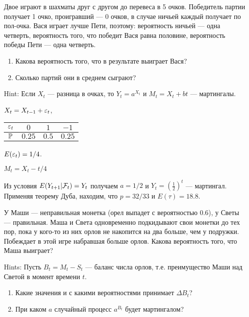 \begin{solution}
\begin{solution}
\begin{solution}
\begin{solution}
\begin{solution}
\begin{solution}
\begin{solution}
\begin{solution}
\begin{solution}
{\begin{problem}
Двое играют в шахматы друг с другом до перевеса в 5 очков. Победитель партии получает 1 очко, проигравший --- 0 очков, в случае ничьей каждый получает по пол-очка. Вася играет лучше Пети, поэтому: вероятность ничьей --- одна четверть, вероятность того, что победит Вася равна половине, вероятность победы Пети --- одна четверть. 
\begin{enumerate}
\item Какова вероятность того, что в результате выиграет Вася? 
\item Сколько партий они в среднем сыграют? 
\end{enumerate}

\end{problem} 
\begin{solution} 

Hint:  Если $X_{t}$ --- разница в очках, то $Y_t=a^{X_{t}}$ и $M_t=X_{t}+bt$ --- мартингалы. 

$X_t=X_{t-1}+\e_t$,

\begin{tabular}{cccc}
$\e_t$ & $0$ & $1$ & $-1$ \\ 
\hline 
$\P$ & $0.25$ & $0.5$ & $0.25$ \\ 
\end{tabular} 

$E(\e_t)=1/4$.

$M_t=X_t-t/4$

Из условия $E(Y_{t+1}|\cF_t)=Y_t$ получаем $a=1/2$ и $Y_t=\left( \frac{1}{2} \right)^t$ --- мартингал. Применяя теорему Дуба, находим, что $p=32/33$ и $E(\tau)=18.8$.


\end{solution}

\begin{problem}
У Маши --- неправильная монетка (орел выпадет с вероятностью 0.6), у Светы --- правильная. Маша и Света одновременно подкидывают свои монетки до тех пор, пока у кого-то из них орлов не накопится на два больше, чем у подружки. Побеждает в этой игре набравшая больше орлов. Какова вероятность того, что Маша выиграет?

Hints: Пусть $B_{t}=M_{t}-S_{t}$ --- баланс числа орлов, т.е. преимущество Маши над Светой в момент времени $t$. 
\begin{enumerate}
\item Какие значения и с какими вероятностями принимает $ \Delta B_{t} $? 
\item При каком $ a $ случайный процесс $ a^{B_{t}} $ будет мартингалом?
\end{enumerate}


\end{problem}}
\end{solution}
\end{solution}
\end{solution}
\end{solution}
\end{solution}
\end{solution}
\end{solution}
\end{solution}
\end{solution}
